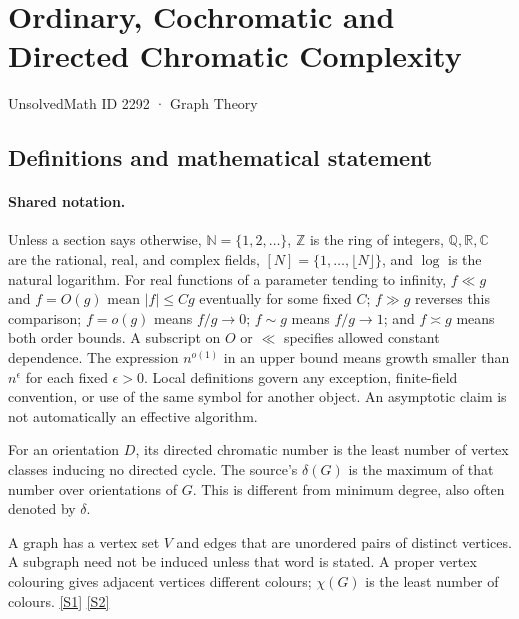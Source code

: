 \documentclass[11pt,a4paper]{article}
\newcommand{\N}{\mathbb{N}}
\newcommand{\Z}{\mathbb{Z}}
\newcommand{\Q}{\mathbb{Q}}
\newcommand{\R}{\mathbb{R}}
\newcommand{\C}{\mathbb{C}}
\newcommand{\sref}[2]{\hyperlink{source:#1:#2}{[S#2]}}
\begin{document}

\setcounter{section}{2291}

\section{Ordinary, Cochromatic and Directed Chromatic Complexity}\label{2292}

{\small\sffamily UnsolvedMath ID 2292 · Graph Theory}

\subsection{Definitions and mathematical statement}

\paragraph{Shared notation.}Unless a section says otherwise, $\N=\{1,2,\ldots\}$,
$\Z$ is the ring of integers, $\Q,\R,\C$ are the rational, real, and complex
fields, $[N]=\{1,\ldots,\lfloor N\rfloor\}$, and $\log$ is the natural
logarithm. For real functions of a parameter tending to infinity,
$f\ll g$ and $f=O(g)$ mean $|f|\leq Cg$ eventually for some fixed $C$;
$f\gg g$ reverses this comparison; $f=o(g)$ means $f/g\to0$;
$f\sim g$ means $f/g\to1$; and $f\asymp g$ means both order bounds.
A subscript on $O$ or $\ll$ specifies allowed constant dependence.
The expression $n^{o(1)}$ in an upper bound means growth smaller than
$n^\epsilon$ for each fixed $\epsilon>0$. Local definitions govern any
exception, finite-field convention, or use of the same symbol for another
object. An asymptotic claim is not automatically an effective algorithm.



For an orientation $D$, its directed chromatic number is the least number of vertex classes inducing no directed cycle. The source's $\delta(G)$ is the maximum of that number over orientations of $G$. This is different from minimum degree, also often denoted by $\delta$.

A graph has a vertex set $V$ and edges that are unordered pairs of distinct vertices. A subgraph need not be induced unless that word is stated. A proper vertex colouring gives adjacent vertices different colours; $\chi(G)$ is the least number of colours. \sref{2292}{1} \sref{2292}{2}
\end{document}

